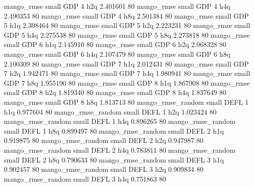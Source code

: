        mango_rmse      small      GDP                 4                  h2q 2.401601 80
       mango_rmse      small      GDP                 4                  h4q 2.490353 80
       mango_rmse      small      GDP                 4                  h8q 2.501384 80
       mango_rmse      small      GDP                 5                  h1q 2.308464 80
       mango_rmse      small      GDP                 5                  h2q 2.223231 80
       mango_rmse      small      GDP                 5                  h4q 2.275538 80
       mango_rmse      small      GDP                 5                  h8q 2.273818 80
       mango_rmse      small      GDP                 6                  h1q 2.145910 80
       mango_rmse      small      GDP                 6                  h2q 2.068328 80
       mango_rmse      small      GDP                 6                  h4q 2.107479 80
       mango_rmse      small      GDP                 6                  h8q 2.100309 80
       mango_rmse      small      GDP                 7                  h1q 2.012431 80
       mango_rmse      small      GDP                 7                  h2q 1.942471 80
       mango_rmse      small      GDP                 7                  h4q 1.980941 80
       mango_rmse      small      GDP                 7                  h8q 1.955190 80
       mango_rmse      small      GDP                 8                  h1q 1.867908 80
       mango_rmse      small      GDP                 8                  h2q 1.819340 80
       mango_rmse      small      GDP                 8                  h4q 1.837649 80
       mango_rmse      small      GDP                 8                  h8q 1.813713 80
mango_rmse_random      small     DEFL                 1                  h1q 0.977604 80
mango_rmse_random      small     DEFL                 1                  h2q 1.023424 80
mango_rmse_random      small     DEFL                 1                  h4q 0.896265 80
mango_rmse_random      small     DEFL                 1                  h8q 0.899497 80
mango_rmse_random      small     DEFL                 2                  h1q 0.919875 80
mango_rmse_random      small     DEFL                 2                  h2q 0.947987 80
mango_rmse_random      small     DEFL                 2                  h4q 0.783811 80
mango_rmse_random      small     DEFL                 2                  h8q 0.790633 80
mango_rmse_random      small     DEFL                 3                  h1q 0.902457 80
mango_rmse_random      small     DEFL                 3                  h2q 0.909834 80
mango_rmse_random      small     DEFL                 3                  h4q 0.751863 80
